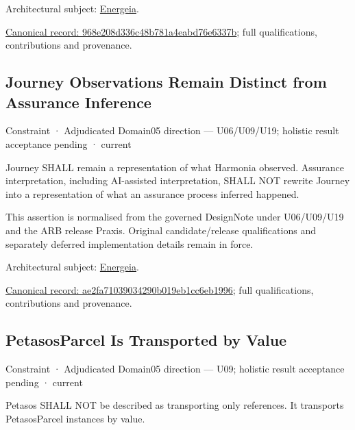 Architectural subject: \hyperref[element:fb3f37a6ac614415ac486a6de9d35994]{Energeia}.


{\footnotesize \href{../../../../continuum/motivation/constraint/968e208d336c48b781a4eabd76e6337b.md}{Canonical record: 968e208d336c48b781a4eabd76e6337b}; full qualifications, contributions and provenance.}\par
\subsection{Journey Observations Remain Distinct from Assurance Inference}

\label{element:ae2fa71039034290b019eb1cc6eb1996}
{\small Constraint · Adjudicated Domain05 direction — U06/U09/U19; holistic result acceptance pending · current}\par

Journey SHALL remain a representation of what Harmonia observed. Assurance interpretation, including AI-assisted interpretation, SHALL NOT rewrite Journey into a representation of what an assurance process inferred happened.



This assertion is normalised from the governed DesignNote under U06/U09/U19 and the ARB release Praxis. Original candidate/release qualifications and separately deferred implementation details remain in force.



Architectural subject: \hyperref[element:fb3f37a6ac614415ac486a6de9d35994]{Energeia}.


{\footnotesize \href{../../../../continuum/motivation/constraint/ae2fa71039034290b019eb1cc6eb1996.md}{Canonical record: ae2fa71039034290b019eb1cc6eb1996}; full qualifications, contributions and provenance.}\par
\subsection{PetasosParcel Is Transported by Value}

\label{element:b599ebffaf2f4e9e8deaec2ed98f2cd7}
{\small Constraint · Adjudicated Domain05 direction — U09; holistic result acceptance pending · current}\par

Petasos SHALL NOT be described as transporting only references. It transports PetasosParcel instances by value.



